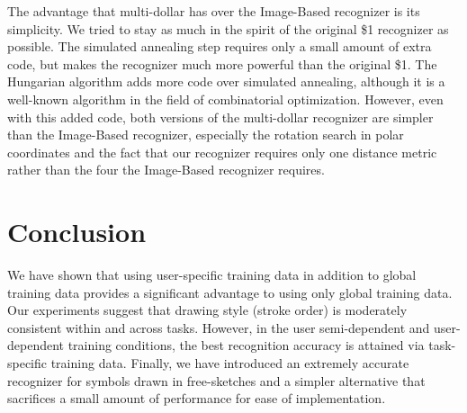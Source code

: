 \documentclass[final,5p,twocolumn]{elsarticle}
\providecommand{\note}[1]{\textcolor{red}{\textbf{ #1 }}}
\begin{document}
The advantage that multi-dollar has over the Image-Based
recognizer is its simplicity. We tried to stay as much in the spirit
of the original \$1 recognizer as possible. The simulated annealing
step requires only a small amount of extra code, but makes the recognizer
much more powerful than the original \$1.
The Hungarian algorithm adds more code
over simulated annealing, although it is a well-known
algorithm in the field of combinatorial optimization.
However, even with this added code, both versions of the multi-dollar recognizer
are simpler
than the Image-Based recognizer, especially the rotation search in
polar coordinates and the fact that our recognizer requires only one
distance metric rather than the four the Image-Based recognizer
requires.




\section{Conclusion}

We have shown that using user-specific training data in addition to global 
training data provides a significant advantage to using only global training
data. Our experiments suggest that drawing style (stroke order) is moderately consistent within and across tasks. However, in the user semi-dependent and user-dependent training conditions, the best
recognition accuracy is attained via task-specific training data.  Finally,
we have introduced an extremely accurate recognizer for symbols drawn in 
free-sketches and a simpler alternative that sacrifices a small amount of 
performance for ease of implementation.
\end{document}
